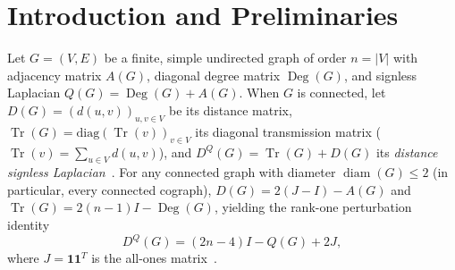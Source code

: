 \documentclass[11pt,a4paper]{article}
\theoremstyle{definition}
\DeclareMathOperator{\Tr}{Tr}
\DeclareMathOperator{\mult}{mult}
\DeclareMathOperator{\Deg}{Deg}
\DeclareMathOperator{\diam}{diam}
\begin{document}
\begin{abstract}
\begin{enumerate}
  \begin{align*}
    \mult_{Q(G)}(\mu) &\le 5\nabla(G) - 4 && (\mu \notin \mathcal{T}_{Q,\max}(G)), \\
    \mult_{D^Q(G)}(\theta) &\le 5\nabla(G) - 3 && (\theta \notin \mathcal{T}^Q_{\max}(G)).
  \end{align*}
  Conversely, although exact symbolic enumeration in SymPy of all $1{,}170$ non-isomorphic connected cographs of order $n \le 9$ reveals zero violations of $\mult_Q \le \nabla$ and $\mult_{D^Q} \le \nabla + 1$, \emph{both} bounds fail linearly on general connected cographs: starting from the $60$-vertex cograph $B = K_{36} \vee (3 H_8)$ (for which we prove analytically that $\nabla(B)=3$ and $\mult_{Q(B)}(40) = 4$), the family $F_s = K_1 \vee (s \cdot B)$ ($s \ge 1$) satisfies $\nabla(F_s) = 3s$ while both $Q(F_s)$ and $D^Q(F_s)$ attain non-local multiplicity at least $4s - 1 = \frac{4}{3}\nabla(F_s) - 1$. Defining $M_Q(k)$ and $M_{D^Q}(k)$ as the maximum non-local multiplicities over connected cographs of Dilworth number $k$, the asymptotic growth constants satisfy $\frac{4}{3} \le c_Q^* = c_{D^Q}^* \le 5$, separating $Q$ and $D^Q$ fundamentally from $A$, $D$, and $S$.
\end{enumerate}

\smallskip
\noindent\textbf{Keywords:} Distance signless Laplacian; signless Laplacian; $\mathcal{C}$-graph; cograph; threshold graph; Dilworth number; eigenvalue multiplicity.

\smallskip
\noindent\textbf{2020 Mathematics Subject Classification:} 05C50; 15A18.
\end{abstract}

\section{Introduction and Preliminaries}\label{sec:intro}

Let $G = (V, E)$ be a finite, simple undirected graph of order $n = |V|$ with adjacency matrix $A(G)$, diagonal degree matrix $\Deg(G)$, and signless Laplacian $Q(G) = \Deg(G) + A(G)$. When $G$ is connected, let $D(G) = (d(u,v))_{u,v\in V}$ be its distance matrix, $\Tr(G) = \mathrm{diag}(\Tr(v))_{v\in V}$ its diagonal transmission matrix ($\Tr(v) = \sum_{u\in V} d(u,v)$), and $D^Q(G) = \Tr(G) + D(G)$ its \emph{distance signless Laplacian}~\cite{AH2016}. For any connected graph with diameter $\diam(G) \le 2$ (in particular, every connected cograph), $D(G) = 2(J-I) - A(G)$ and $\Tr(G) = 2(n-1)I - \Deg(G)$, yielding the rank-one perturbation identity
\begin{equation}\label{eq:rank1}
  D^Q(G) = (2n - 4)I - Q(G) + 2J,
\end{equation}
where $J = \mathbf{1}\mathbf{1}^T$ is the all-ones matrix~\cite{MM2026,MMT2026}.
\end{document}

